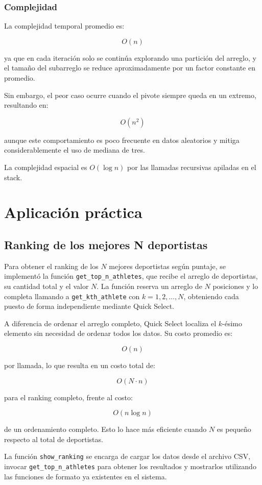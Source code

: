 \subsubsection{Complejidad}

La complejidad temporal promedio es:

\[
O(n)
\]

ya que en cada iteración solo se continúa explorando una partición del arreglo, y el tamaño del subarreglo se reduce aproximadamente por un factor constante en promedio.

Sin embargo, el peor caso ocurre cuando el pivote siempre queda en un extremo, resultando en:

\[
O(n^2)
\]

aunque este comportamiento es poco frecuente en datos aleatorios y mitiga considerablemente el uso de mediana de tres.

La complejidad espacial es $O(\log n)$ por las llamadas recursivas apiladas en el stack.

\section{Aplicación práctica}

\subsection{Ranking de los mejores N deportistas}
Para obtener el ranking de los \(N\) mejores deportistas según puntaje, se implementó la función \texttt{get\_top\_n\_athletes}, que recibe el arreglo de deportistas, su cantidad total y el valor \(N\). La función reserva un arreglo de \(N\) posiciones y lo completa llamando a \texttt{get\_kth\_athlete} con \(k = 1, 2, \ldots, N\), obteniendo cada puesto de forma independiente mediante Quick Select.

A diferencia de ordenar el arreglo completo, Quick Select localiza el \(k\)-ésimo elemento sin necesidad de ordenar todos los datos. Su costo promedio es:

\[
O(n)
\]

por llamada, lo que resulta en un costo total de:

\[
O(N \cdot n)
\]

para el ranking completo, frente al costo:

\[
O(n \log n)
\]

de un ordenamiento completo. Esto lo hace más eficiente cuando \(N\) es pequeño respecto al total de deportistas.

La función \texttt{show\_ranking} se encarga de cargar los datos desde el archivo CSV, invocar \texttt{get\_top\_n\_athletes} para obtener los resultados y mostrarlos utilizando las funciones de formato ya existentes en el sistema.
